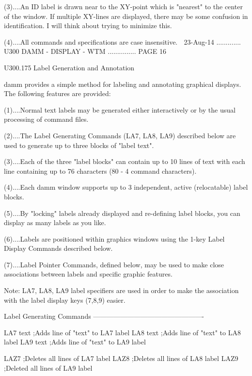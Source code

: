    (3)....An  ID label is drawn near to the XY-point which is "nearest" to the
          center of the window. If multiple XY-lines are displayed, there  may
          be  some  confusion  in identification. I will think about trying to
          minimize this.
 
   (4)....All commands and specifications are case insensitive.
    
   23-Aug-14 ............. U300  DAMM - DISPLAY - WTM ............... PAGE  16
 
 
   U300.175  Label Generation and Annotation
 
   damm provides  a  simple  method  for  labeling  and  annotating  graphical
   displays. The following features are provided:
 
   (1)....Normal  text  labels may be generated either interactively or by the
          usual processing of command files.
 
   (2)....The Label Generating Commands (LA7, LA8, LA9)  described  below  are
          used to generate up to three blocks of "label text".
 
   (3)....Each  of the three "label blocks" can contain up to 10 lines of text
          with each line containing up  to  76  characters  (80  -  4  command
          characters).
 
   (4)....Each  damm window supports up to 3 independent, active (relocatable)
          label blocks.
 
   (5)....By "locking" labels already displayed and re-defining label  blocks,
          you can display as many labels as you like.
 
   (6)....Labels  are positioned within graphics windows using the 1-key Label
          Display Commands described below.
 
   (7)....Label Pointer Commands, defined below, may be  used  to  make  close
          associations between labels and specific graphic features.
 
   Note:  LA7,  LA8,  LA9  label  specifiers  are  used  in  order to make the
   association with the label display keys (7,8,9) easier.
 
   Label Generating Commands -------------------------------------------------
 
   LA7  text   ;Adds line of "text" to LA7 label
   LA8  text   ;Adds line of "text" to LA8 label
   LA9  text   ;Adds line of "text" to LA9 label
 
   LAZ7        ;Deletes all lines of   LA7 label
   LAZ8        ;Deletes all lines of   LA8 label
   LAZ9        ;Deleted all lines of   LA9 label
 
